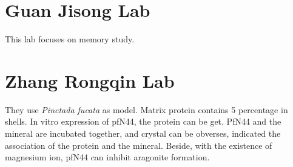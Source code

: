 \documentclass[11pt, oneside]{article}   	%
\begin{document}
\section{Guan Jisong Lab}
	\par
	This lab focuses on memory study.
	\par
\section{Zhang Rongqin Lab}
	\par
	They use \textsl{Pinctada fucata} as model. Matrix protein contains 5 percentage in shells. In vitro expression of pfN44, the protein can be get. PfN44 and the mineral are incubated together, and crystal can be obverses, indicated the association of the protein and the mineral. Beside, with the existence of magnesium ion, pfN44 can inhibit aragonite formation.
\end{document}
